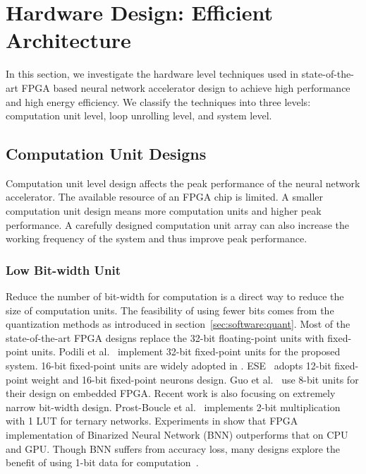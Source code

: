 \section{Hardware Design: Efficient Architecture}\label{sec:hardware}

In this section, we investigate the hardware level techniques used in state-of-the-art FPGA based neural network accelerator design to achieve high performance and high energy efficiency. We classify the techniques into three levels: computation unit level, loop unrolling level, and system level.

\subsection{Computation Unit Designs}\label{sec:hardware:cu}

Computation unit level design affects the peak performance of the neural network accelerator. The available resource of an FPGA chip is limited. A smaller computation unit design means more computation units and higher peak performance. A carefully designed computation unit array can also increase the working frequency of the system and thus improve peak performance.

\subsubsection{Low Bit-width Unit}\label{sec:hardware:cu:lbu}
Reduce the number of bit-width for computation is a direct way to reduce the size of computation units. The feasibility of using fewer bits comes from the quantization methods as introduced in section~\ref{sec:software:quant}. Most of the state-of-the-art FPGA designs replace the 32-bit floating-point units with fixed-point units. Podili et al.~\cite{podili2017fast} implement 32-bit fixed-point units for the proposed system. 16-bit fixed-point units are widely adopted in \cite{qiu2016going, li2016high, xiao2017exploring, guan2017fp, zhang2016caffeine}. ESE~\cite{han2017ese} adopts 12-bit fixed-point weight and 16-bit fixed-point neurons design. Guo et al.~\cite{guo2017angel} use 8-bit units for their design on embedded FPGA. Recent work is also focusing on extremely narrow bit-width design. Prost-Boucle et al.~\cite{prost2017scalable} implements 2-bit multiplication with 1 LUT for ternary networks. Experiments in \cite{nurvitadhi2016accelerating} show that FPGA implementation of Binarized Neural Network (BNN) outperforms that on CPU and GPU. Though BNN suffers from accuracy loss, many designs explore the benefit of using 1-bit data for computation~\cite{li20177, nakahara2017batch, zhao2017accelerating, umuroglu2017finn, nakahara2017fully, jiao2017accelerating, moss2017high}.

